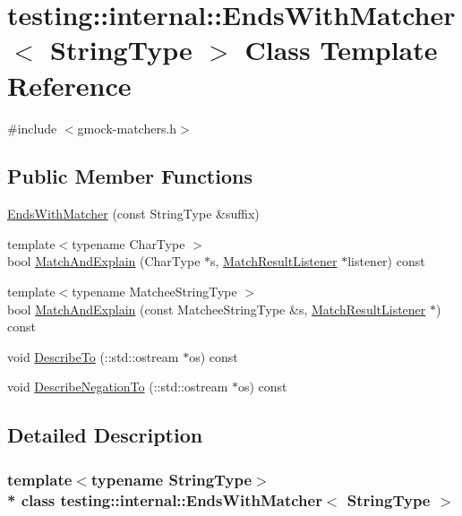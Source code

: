 \hypertarget{classtesting_1_1internal_1_1_ends_with_matcher}{}\section{testing\+:\+:internal\+:\+:Ends\+With\+Matcher$<$ String\+Type $>$ Class Template Reference}
\label{classtesting_1_1internal_1_1_ends_with_matcher}


{\ttfamily \#include $<$gmock-\/matchers.\+h$>$}

\subsection*{Public Member Functions}
\begin{DoxyCompactItemize}
\item 
\hyperlink{classtesting_1_1internal_1_1_ends_with_matcher_a38726091c8767c2d8a15abf2a8c2018a}{Ends\+With\+Matcher} (const String\+Type \&suffix)
\item 
{\footnotesize template$<$typename Char\+Type $>$ }\\bool \hyperlink{classtesting_1_1internal_1_1_ends_with_matcher_a281af996c884f3a3f169568bbaea92bf}{Match\+And\+Explain} (Char\+Type $\ast$s, \hyperlink{classtesting_1_1_match_result_listener}{Match\+Result\+Listener} $\ast$listener) const 
\item 
{\footnotesize template$<$typename Matchee\+String\+Type $>$ }\\bool \hyperlink{classtesting_1_1internal_1_1_ends_with_matcher_a45b235e2d4cc281ff37e3fa35fe4aa29}{Match\+And\+Explain} (const Matchee\+String\+Type \&s, \hyperlink{classtesting_1_1_match_result_listener}{Match\+Result\+Listener} $\ast$) const 
\item 
void \hyperlink{classtesting_1_1internal_1_1_ends_with_matcher_a5095517ef55ab080a37ea0fe1f379255}{Describe\+To} (\+::std\+::ostream $\ast$os) const 
\item 
void \hyperlink{classtesting_1_1internal_1_1_ends_with_matcher_a6ba5fb035a50fb6c0aad4f1421d3fb20}{Describe\+Negation\+To} (\+::std\+::ostream $\ast$os) const 
\end{DoxyCompactItemize}


\subsection{Detailed Description}
\subsubsection*{template$<$typename String\+Type$>$\\*
class testing\+::internal\+::\+Ends\+With\+Matcher$<$ String\+Type $>$}



